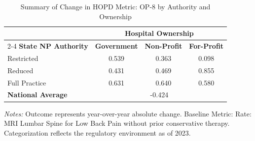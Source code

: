 \begin{table}[htbp]
    \centering
    \caption{Summary of Change in HOPD Metric: OP-8 by Authority and Ownership}
    \label{tab:d_hopd_op_8_own}
    \vspace{0.2cm}
    \begin{tabular}{lccc}
        \toprule
        & \multicolumn{3}{c}{\textbf{Hospital Ownership}} \\
        \cmidrule(lr){2-4}
        \textbf{State NP Authority} & \textbf{Government} & \textbf{Non-Profit} & \textbf{For-Profit} \\
        \midrule
        Restricted & 0.539 & 0.363 & 0.098 \\
        Reduced & 0.431 & 0.469 & 0.855 \\
        Full Practice & 0.631 & 0.640 & 0.580 \\
        \midrule
        \textbf{National Average} & \multicolumn{3}{c}{-0.424} \\
        \bottomrule
    \end{tabular}
    \vspace{0.1cm}
    \begin{minipage}{0.85\textwidth}
        \footnotesize \textit{Notes:} Outcome represents year-over-year absolute change. Baseline Metric: Rate: MRI Lumbar Spine for Low Back Pain without prior conservative therapy. Categorization reflects the regulatory environment as of 2023.
    \end{minipage}
\end{table}